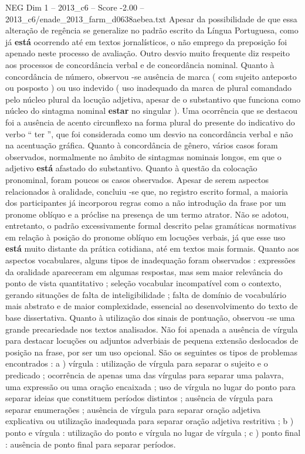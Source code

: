 \begin{textsample}{NEG Dim 1 – 2013\_c6 – Score -2.00 – 2013\_c6/enade\_2013\_farm\_d0638aebea.txt}
Apesar da possibilidade de que essa alteração de regência se generalize no padrão escrito da Língua Portuguesa, como já \textbf{está} ocorrendo até em textos jornalísticos, o não emprego da preposição foi apenado neste processo de avaliação.
Outro desvio muito frequente diz respeito aos processos de concordância verbal e de concordância nominal.
Quanto à concordância de número, observou -se ausência de marca ( com sujeito anteposto ou posposto ) ou uso indevido ( uso inadequado da marca de plural comandado pelo núcleo plural da locução adjetiva, apesar de o substantivo que funciona como núcleo do sintagma nominal \textbf{estar} no singular ).
Uma ocorrência que se destacou foi a ausência de acento circunflexo na forma plural do presente do indicativo do verbo “ ter ”, que foi considerada como um desvio na concordância verbal e não na acentuação gráfica.
Quanto à concordância de gênero, vários casos foram observados, normalmente no âmbito de sintagmas nominais longos, em que o adjetivo \textbf{está} afastado do substantivo.
Quanto à questão da colocação pronominal, foram poucos os casos observados.
Apesar de serem aspectos relacionados à oralidade, concluiu -se que, no registro escrito formal, a maioria dos participantes já incorporou regras como a não introdução da frase por um pronome oblíquo e a próclise na presença de um termo atrator.
Não se adotou, entretanto, o padrão excessivamente formal descrito pelas gramáticas normativas em relação à posição do pronome oblíquo em locuções verbais, já que esse uso \textbf{está} muito distante da prática cotidiana, até em textos mais formais.
Quanto aos aspectos vocabulares, alguns tipos de inadequação foram observados : expressões da oralidade apareceram em algumas respostas, mas sem maior relevância do ponto de vista quantitativo ; seleção vocabular incompatível com o contexto, gerando situações de falta de inteligibilidade ; falta de domínio de vocabulário mais abstrato e de maior complexidade, essencial ao desenvolvimento do texto de base dissertativa.
Quanto à utilização dos sinais de pontuação, observou -se uma grande precariedade nos textos analisados.
Não foi apenada a ausência de vírgula para destacar locuções ou adjuntos adverbiais de pequena extensão deslocados de posição na frase, por ser um uso opcional.
São os seguintes os tipos de problemas encontrados : a ) vírgula : utilização de vírgula para separar o sujeito e o predicado ; ocorrência de apenas uma das vírgulas para separar uma palavra, uma expressão ou uma oração encaixada ; uso de vírgula no lugar do ponto para separar ideias que constituem períodos distintos ; ausência de vírgula para separar enumerações ; ausência de vírgula para separar oração adjetiva explicativa ou utilização inadequada para separar oração adjetiva restritiva ; b ) ponto e vírgula : utilização do ponto e vírgula no lugar de vírgula ; c ) ponto final : ausência de ponto final para separar períodos.

\end{textsample}
